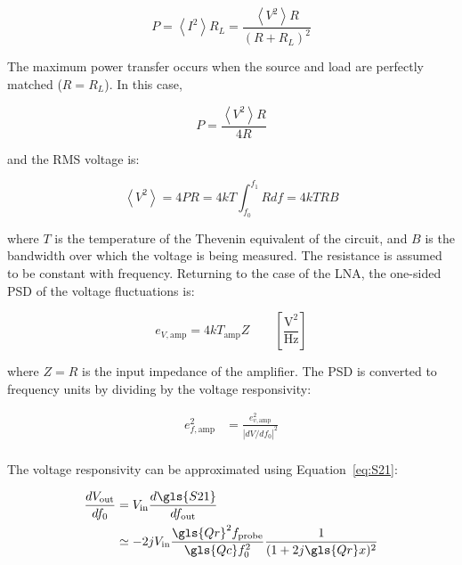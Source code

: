 \begin{equation}
  P = \left<I^{2}\right>R_{L} = \frac{\left<V^{2}\right>R}{(R + R_{L})^{2}}
\end{equation}

The maximum power transfer occurs when the source and load are perfectly matched ($R = R_{L}$). In this case,

\begin{equation}
 P = \frac{\left<V^{2}\right>R}{4R}
\end{equation}

and the RMS voltage is:

\begin{equation}
  \left<V^{2}\right> = 4PR = 4kT\int_{f_{0}}^{f_{1}} R df = 4kTRB
\end{equation}

where $T$ is the temperature of the Thevenin equivalent of the circuit, and $B$ is the bandwidth over which the voltage is being measured. The resistance is assumed to be constant with frequency. Returning to the case of the LNA, the one-sided PSD of the voltage fluctuations is:

\begin{equation} \label{eq: johnson noise}
   e_{V,\mathrm{amp}} = 4kT_{\mathrm{amp}}Z \qquad  \left[ \frac{\mathrm{V}^{2}}{\mathrm{Hz}} \right]
\end{equation}

where $Z = R$ is the input impedance of the amplifier. The PSD is converted to frequency units by dividing by the voltage responsivity:

\begin{equation} \label{eq:ef amp}
  \begin{aligned}
  e_{f,\mathrm{amp}}^{2} &= \frac{e_{v,\mathrm{amp}}^{2}}{\left| dV/df_{0} \right|^{2}} \\
  \end{aligned}
\end{equation}

The voltage responsivity can be approximated using Equation~\ref{eq:S21}:

\begin{equation}
  \begin{aligned}
  \frac{dV_{\mathrm{out}}}{df_{0}} &= V_{\mathrm{in}}\frac{d\gls{S21}}{df_{\mathrm{out}}} \\
                         &\simeq -2jV_{\mathrm{in}}\frac{\gls{Qr}^{2}f_{\mathrm{probe}}}{\gls{Qc}f_{0}^{2}}\frac{1}{(1 + 2j\gls{Qr}x)^{2}}
  \end{aligned}
 \end{equation}

